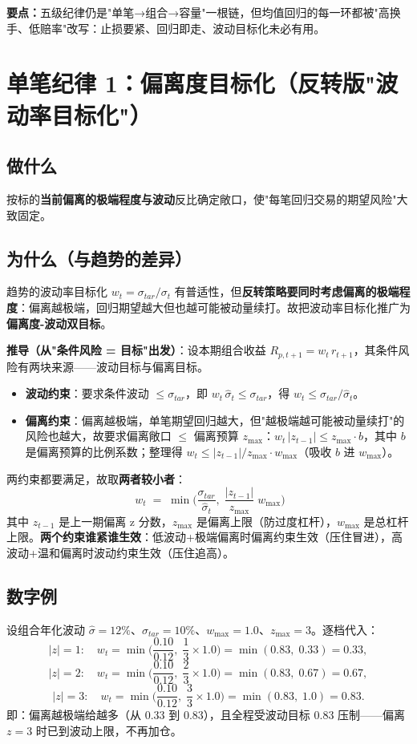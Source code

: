 \documentclass[UTF8,11pt]{ctexart}
\newcommand{\takeaway}[1]{\medskip\par\noindent\textbf{要点：}#1\par\medskip}
\begin{document}
\takeaway{五级纪律仍是"单笔→组合→容量"一根链，但均值回归的每一环都被"高换手、低赔率"改写：止损要紧、回归即走、波动目标化未必有用。}

\section{单笔纪律 1：偏离度目标化（反转版"波动率目标化"）}
\subsection{做什么}
按标的\textbf{当前偏离的极端程度与波动}反比确定敞口，使"每笔回归交易的期望风险"大致固定。
\subsection{为什么（与趋势的差异）}
趋势的波动率目标化 $w_t=\sigma_{tar}/\sigma_t$ 有普适性，但\textbf{反转策略要同时考虑偏离的极端程度}：偏离越极端，回归期望越大但也越可能被动量续打。故把波动率目标化推广为\textbf{偏离度-波动双目标}。

\textbf{推导（从"条件风险 = 目标"出发）}：设本期组合收益 $R_{p,t+1}=w_t\,r_{t+1}$，其条件风险有两块来源——波动目标与偏离目标。
\begin{itemize}[itemsep=2pt]
\item \textbf{波动约束}：要求条件波动 $\le\sigma_{tar}$，即 $w_t\,\hat\sigma_t\le\sigma_{tar}$，得 $w_t\le\sigma_{tar}/\hat\sigma_t$。
\item \textbf{偏离约束}：偏离越极端，单笔期望回归越大，但"越极端越可能被动量续打"的风险也越大，故要求偏离敞口 $\le$ 偏离预算 $z_{\max}$：$w_t\,|z_{t-1}|\le z_{\max}\cdot b$，其中 $b$ 是偏离预算的比例系数；整理得 $w_t\le |z_{t-1}|/z_{\max}\cdot w_{\max}$（吸收 $b$ 进 $w_{\max}$）。
\end{itemize}
两约束都要满足，故取\textbf{两者较小者}：
\begin{equation}
\boxed{\; w_t \;=\; \min\!\Big(\frac{\sigma_{tar}}{\hat\sigma_t},\; \frac{|z_{t-1}|}{z_{\max}}\; w_{\max}\Big)}
\end{equation}
其中 $z_{t-1}$ 是上一期偏离 z 分数，$z_{\max}$ 是偏离上限（防过度杠杆），$w_{\max}$ 是总杠杆上限。\textbf{两个约束谁紧谁生效}：低波动+极端偏离时偏离约束生效（压住冒进），高波动+温和偏离时波动约束生效（压住追高）。
\subsection{数字例}
设组合年化波动 $\hat\sigma=12\%$、$\sigma_{tar}=10\%$、$w_{\max}=1.0$、$z_{\max}=3$。逐档代入：
\begin{equation}
|z|=1:\quad w_t=\min\!\Big(\frac{0.10}{0.12},\;\frac{1}{3}\times1.0\Big)=\min(0.83,\;0.33)=0.33,
\end{equation}
\begin{equation}
|z|=2:\quad w_t=\min\!\Big(\frac{0.10}{0.12},\;\frac{2}{3}\times1.0\Big)=\min(0.83,\;0.67)=0.67,
\end{equation}
\begin{equation}
|z|=3:\quad w_t=\min\!\Big(\frac{0.10}{0.12},\;\frac{3}{3}\times1.0\Big)=\min(0.83,\;1.0)=0.83.
\end{equation}
即：偏离越极端给越多（从 $0.33$ 到 $0.83$），且全程受波动目标 $0.83$ 压制——偏离 $z=3$ 时已到波动上限，不再加仓。
\end{document}
